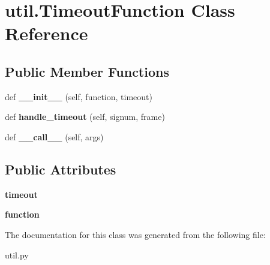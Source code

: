 \hypertarget{classutil_1_1_timeout_function}{}\section{util.\+Timeout\+Function Class Reference}
\label{classutil_1_1_timeout_function}
\subsection*{Public Member Functions}
\begin{DoxyCompactItemize}
\item 
\mbox{\label{classutil_1_1_timeout_function_a6cba9d2d064cd8fb00fb8c281d174eff}} 
def {\bfseries \+\_\+\+\_\+init\+\_\+\+\_\+} (self, function, timeout)
\item 
\mbox{\label{classutil_1_1_timeout_function_aa7f7a6b73e2aaa4659197fb6feba9e1c}} 
def {\bfseries handle\+\_\+timeout} (self, signum, frame)
\item 
\mbox{\label{classutil_1_1_timeout_function_a59209385cbe2cb4bfd5c488a51404051}} 
def {\bfseries \+\_\+\+\_\+call\+\_\+\+\_\+} (self, args)
\end{DoxyCompactItemize}
\subsection*{Public Attributes}
\begin{DoxyCompactItemize}
\item 
\mbox{\label{classutil_1_1_timeout_function_a4cbbcc8ad43fc8e2a5665a76178bc3aa}} 
{\bfseries timeout}
\item 
\mbox{\label{classutil_1_1_timeout_function_ac969bf0077874d36f87e2aba1628b664}} 
{\bfseries function}
\end{DoxyCompactItemize}


The documentation for this class was generated from the following file\+:\begin{DoxyCompactItemize}
\item 
util.\+py\end{DoxyCompactItemize}
